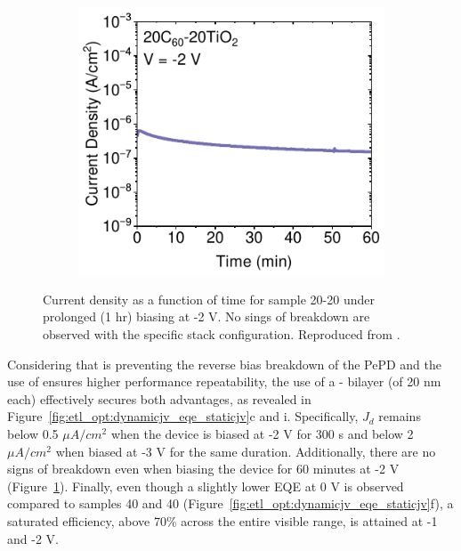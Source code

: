 \begin{figure}[htbp]
    \centering
    \begin{subfigure}[t]{0.5\textwidth}
        \centering
        \includegraphics[width=\textwidth]{chapters/transport_layers/images/JV_1hr_20_20.pdf} %
                
    \end{subfigure}

    \caption[Current density as a function of time for sample 20-20 under prolonged (1 hr) biasing at -2 V.]{Current density as a function of time for sample 20-20 under prolonged (1 hr) biasing at -2 V. No sings of breakdown are observed with the specific stack configuration. Reproduced from \cite{Papadopoulou2025ElectronSpeed}.}
    \label{fig:et_optim:1hr_stability}
\end{figure}



Considering that  is preventing the reverse bias breakdown of the PePD and the use of  ensures higher performance repeatability, the use of a - bilayer (of 20 nm each) effectively secures both advantages, as revealed in Figure~\ref{fig:etl_opt:dynamicjv_eqe_staticjv}c and i. Specifically, $J_d$ remains below 0.5 $\mu A/cm^2$ when the device is biased at -2 V for 300 s and below 2 $\mu A/cm^2$ when biased at -3 V for the same duration. Additionally, there are no signs of breakdown even when biasing the device for 60 minutes at -2 V (Figure~\ref{fig:et_optim:1hr_stability}). Finally, even though a slightly lower EQE at 0 V is observed compared to samples 40 and 40 (Figure~\ref{fig:etl_opt:dynamicjv_eqe_staticjv}f), a saturated efficiency, above 70\% across the entire visible range, is attained at -1 and -2 V. 

